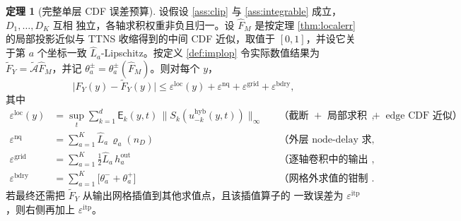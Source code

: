 \documentclass[a4paper,11pt]{article}
\theoremstyle{definition}
\newtheorem{theorem}{定理}
\newcommand{\1}{\mathbf 1}
\newcommand{\Eerr}{\mathsf E}
\begin{document}
\begin{theorem}[完整单层 CDF 误差预算]
\label{thm:fullbudget}
设假设 \ref{ass:clip} 与 \ref{ass:integrable} 成立，$D_1,\ldots,D_K$ 互相
独立，各轴求积权重非负且归一。设 $\widehat F_M$ 是按定理
\ref{thm:localerr} 的局部投影近似与 TTNS 收缩得到的中间 CDF 近似，取值于
$[0,1]$，并设它关于第 $a$ 个坐标一致 $\widehat L_a$-Lipschitz。按定义
\ref{def:implop} 令实际数值结果为
$\widetilde F_Y=\widetilde{\mathcal A}\widehat F_M$，并记
$\theta_a^{\pm}=\theta_a^{\pm}(\widehat F_M)$。则对每个 $y$，
\[
\bigl|F_Y(y)-\widetilde F_Y(y)\bigr|
\le
\varepsilon^{\mathrm{loc}}(y)
+\varepsilon^{\mathrm{nq}}
+\varepsilon^{\mathrm{grid}}
+\varepsilon^{\mathrm{bdry}},
\]
其中
\[
\begin{aligned}
\varepsilon^{\mathrm{loc}}(y)
&=
\sup_{t}\sum_{k=1}^{d}
\Eerr_k(y,t)\,\bigl\|S_k(u_{-k}^{\mathrm{hyb}}(y,t))\bigr\|_\infty
&&\text{（截断 $+$ 局部求积 $+$ edge CDF 近似）},\\
\varepsilon^{\mathrm{nq}}
&=
\sum_{a=1}^{K}\widehat L_a\,\varrho_a(n_D)
&&\text{（外层 node-delay 求积）},\\
\varepsilon^{\mathrm{grid}}
&=
\sum_{a=1}^{K}\tfrac12\widehat L_a\,h_a^{\mathrm{out}}
&&\text{（逐轴卷积中的输出网格插值）},\\
\varepsilon^{\mathrm{bdry}}
&=
\sum_{a=1}^{K}\bigl[\theta_a^-+\theta_a^+\bigr]
&&\text{（网格外求值的钳制／常数外延）} .
\end{aligned}
\]
若最终还需把 $\widetilde F_Y$ 从输出网格插值到其他求值点，且该插值算子的
一致误差为 $\varepsilon^{\mathrm{itp}}$，则右侧再加上 $\varepsilon^{\mathrm{itp}}$。
\end{theorem}
\end{document}
